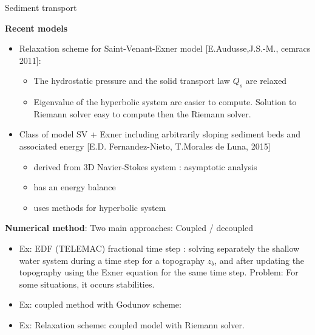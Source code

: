    
\begin{frame}{Sediment transport}

\textbf{Recent models}

\begin{itemize}

\item Relaxation scheme for Saint-Venant-Exner model [E.Audusse,J.S.-M., cemracs 2011]:

\begin{itemize}
\item The hydrostatic pressure and the solid transport law $Q_s$ are relaxed 
\item Eigenvalue of the hyperbolic system are easier to compute. Solution to Riemann solver easy to compute then the Riemann solver.
\end{itemize}


\item Class of model SV + Exner including arbitrarily sloping sediment beds and associated energy [E.D. Fernandez-Nieto, T.Morales de Luna, 2015] 

\begin{itemize}
\item derived from 3D Navier-Stokes system : asymptotic analysis 
\item has an energy balance 
\item uses methods for hyperbolic system
\end{itemize}

\end{itemize}

\textbf{Numerical method}: Two main approaches: Coupled / decoupled


\begin{itemize}

\item Ex: EDF (TELEMAC) fractional time step : solving separately the shallow water system during a time step
for a topography $z_b$, and after updating the topography using the Exner equation for the same time step.
Problem: For some situations, it occurs stabilities.

\item Ex: coupled method with Godunov scheme:

\item Ex: Relaxation scheme: coupled model with Riemann solver.

\end{itemize}


\end{frame}




